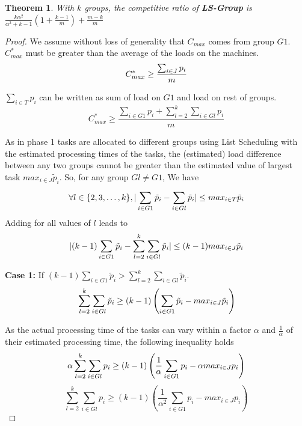 \documentclass[10pt, conference, compsocconf]{IEEEtran}
\newtheorem{theorem}{Theorem}
\begin{document}
\begin{theorem}
  \label{th:strategy3}
  With $k$ groups, the competitive ratio of
  \textbf{LS-Group } is $ \frac{k\alpha^{2}}{\alpha^{2}+k-1} (1+
  {\frac{k-1}{m}} ) + \frac{m-k}{m}$
\end{theorem}
\begin{proof} 
  We assume without loss of generality that $ C_{max}$ comes from
  group $G1$. $C_{max}^{*}$ must be greater than the average of the
  loads on the machines.
  \begin{equation}{\nonumber}
    C_{max}^{*} \geq  \frac{\sum_{i \in J}^{}{{p_{i}}}}{m}
  \end{equation}

  $\sum_{i \in T }{{p_{i}}}$ can be written as sum of load on $G1$ and
  load on rest of groups.
  \begin{equation}\label{eq11}
    C_{max}^{*} \geq  \frac{\sum_{i \in G1 }^{}{{p_{i}}}+ \sum_{l=2}^{k}\sum_{i \in Gl }^{}{{p_{i}}}}{m}
  \end{equation}

  As in phase 1 tasks are allocated to different groups using List
  Scheduling with the estimated processing times of the tasks, the
  (estimated) load difference between any two groups cannot be greater
  than the estimated value of largest task ${max_{i \in J}}{\tilde
    p_{i}}$.  So, for any group $Gl \neq G1$, We have
  \begin{equation}{\nonumber}
\forall l \in \{2, 3, \dots ,k\}, |\sum_{i \in G1 }^{}{\tilde p_{i}}- \sum_{i \in Gl }^{}{\tilde p_{i}}| \leq {max_{i \in T}}{\tilde p_{i}}
  \end{equation}  
  Adding for all values of $l$ leads to
  \begin{equation}{\nonumber}
    |(k-1)\sum_{i \in G1 }^{}{\tilde p_{i}}- \sum_{l=2}^{k}\sum_{i \in Gl }^{}{\tilde p_{i}}| \leq (k-1) {max_{i \in J}}{\tilde p_{i}}
  \end{equation}

  \textbf{Case 1:} If $(k-1)\sum_{i \in G1 }^{}{\tilde p_{i}} >
  \sum_{l=2}^{k}\sum_{i \in Gl }^{}{\tilde p_{i}}$.
  \begin{equation}{\nonumber}
    \sum_{l=2}^{k}\sum_{i \in Gl }^{}{\tilde p_{i}} \geq (k-1) \left( \sum_{i \in G1 }^{}{\tilde p_{i}}- {max_{i \in J}}{\tilde p_{i}} \right)
  \end{equation}

  As the actual processing time of the tasks can vary within a factor
  $\alpha$ and $\frac{1}{\alpha}$ of their estimated processing time,
  the following inequality holds
  \begin{equation}{\nonumber}
    \alpha\sum_{l=2}^{k}\sum_{i \in Gl }^{}{{p_{i}}} \geq (k-1) \left( \frac{1}{\alpha}\sum_{i \in G1 }^{}{{p_{i}}}- \alpha {max_{i \in J}}{{p_{i}}} \right)
  \end{equation}
  \begin{equation}\label{eq9}
    \sum_{l=2}^{k}\sum_{i \in Gl }^{}{{p_{i}}} \geq (k-1) \left(\frac{1}{\alpha^{2}}\sum_{i \in G1 }^{}{{p_{i}}}-  {max_{i \in J}}{{p_{i}}} \right)
  \end{equation}


\end{proof}
\end{document}
